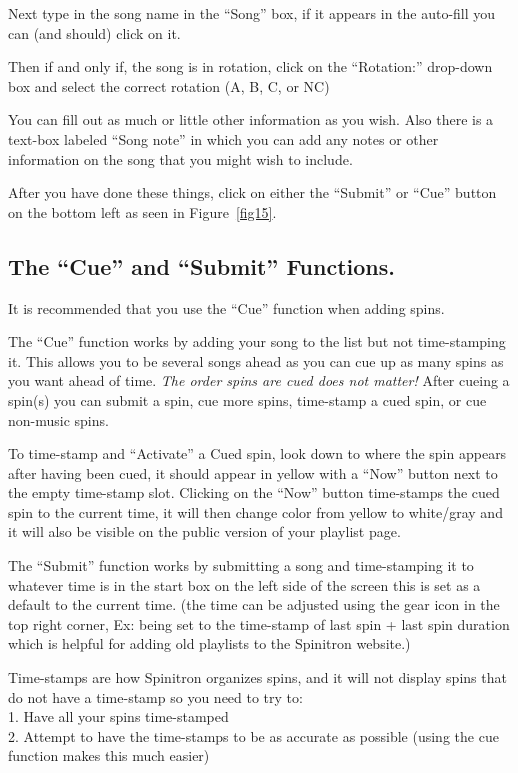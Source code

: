 \documentclass[12pt]{article}
\begin{document}
Next type in the song name in the ``Song'' box,
if it appears in the auto-fill you can (and should) click on it.

Then if and only if, the song is in rotation, click on the ``Rotation:'' drop-down box and select the correct rotation (A, B, C, or NC)

You can fill out as much or little other information as you wish. Also there is a text-box labeled ``Song note'' in which you can add any notes or other information on the song that you might wish to include.

After you have done these things, click on either the ``Submit'' or ``Cue'' button on the bottom left as seen in Figure~\ref{fig15}.

\subsection{The ``Cue'' and ``Submit'' Functions.}

It is recommended that you use the ``Cue'' function when adding spins. 

The ``Cue'' function works by adding your song to the list but not time-stamping it. This allows you to be several songs ahead as you can cue up as many spins as you want ahead of time. {\it The order spins are cued does not matter!} After cueing a spin(s) you can submit a spin, cue more spins, time-stamp a cued spin, or cue non-music spins. 

To time-stamp and ``Activate'' a Cued spin, look down to where the spin appears after having been cued, it should appear in yellow with a ``Now'' button next to the empty time-stamp slot. Clicking on the ``Now'' button time-stamps the cued spin to the current time, it will then change color from yellow to white/gray and it will also be visible on the public version of your playlist page. 


The ``Submit'' function works by submitting a song and time-stamping it to whatever time is in the start box on the left side of the screen this is set as a default to the current time. (the time can be adjusted using the gear icon in the top right corner, Ex: being set to the time-stamp of last spin + last spin duration which is helpful for adding old playlists to the Spinitron website.) 

Time-stamps are how Spinitron organizes spins, and it will not display spins that do not have a time-stamp so you need to try to: 
\\
1. Have all your spins time-stamped 
\\
2. Attempt to have the time-stamps to be as accurate as possible (using the cue function makes this much easier)
\end{document}
